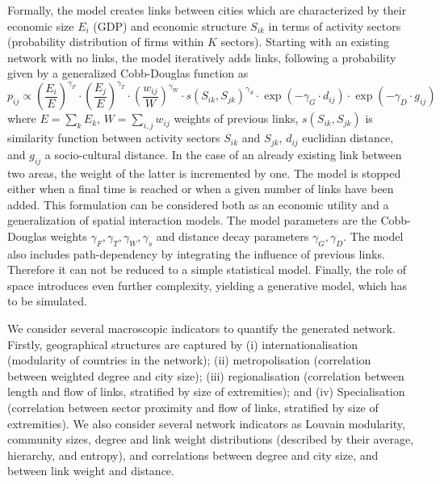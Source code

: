 \documentclass[10pt,letterpaper]{article}
\begin{document}
Formally, the model creates links between cities which are characterized by their economic size $E_i$ (GDP) and economic structure $S_{ik}$ in terms of activity sectors (probability distribution of firms within $K$ sectors). Starting with an existing network with no links, the model iteratively adds links, following a probability given by a generalized Cobb-Douglas function \cite{vilcu2011geometric} as 
\[
p_{ij} \propto \left(\frac{E_{i}}{E}\right)^{\gamma_F} \cdot \left(\frac{E_{j}}{E}\right)^{\gamma_T} \cdot \left(\frac{w_{ij}}{W}\right)^{\gamma_W} \cdot s\left(S_{ik},S_{jk}\right)^{\gamma_S} \cdot \exp \left(- \gamma_G \cdot d_{ij}\right) \cdot \exp \left(- \gamma_D \cdot g_{ij}\right)
\]
where $E  =  \sum_k E_k$, $W  = \sum_{i,j} w_{ij}$ weights of previous links, $s(S_{ik},S_{jk})$ is similarity function between activity sectors $S_{ik}$ and $S_{jk}$, $d_{ij}$ euclidian distance, and $g_{ij}$ a socio-cultural distance. In the case of an already existing link between two areas, the weight of the latter is incremented by one. The model is stopped either when a final time is reached or when a given number of links have been added. This formulation can be considered both as an economic utility and a generalization of spatial interaction models. The model parameters are the Cobb-Douglas weights $\gamma_F,\gamma_T,\gamma_W,\gamma_s$ and distance decay parameters $\gamma_G,\gamma_D$. The model also includes path-dependency by integrating the influence of previous links. Therefore it can not be reduced to a simple statistical model. Finally, the role of space introduces even further complexity, yielding a generative model, which has to be simulated.

We consider several macroscopic indicators to quantify the generated network. Firstly, geographical structures are captured by (i) internationalisation (modularity of countries in the network); (ii) metropolisation (correlation between weighted degree and city size); (iii) regionalisation (correlation between length and flow of links, stratified by size of extremities); and (iv) Specialisation (correlation between sector proximity and flow of links, stratified by size of extremities). We also consider several network indicators as Louvain modularity, community sizes, degree and link weight distributions (described by their average, hierarchy, and entropy), and correlations between degree and city size, and between link weight and distance.
\end{document}
